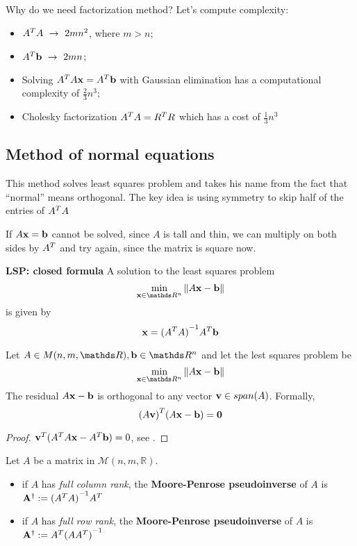 \documentclass[computationalMathematics.tex]{subfiles}
\begin{document}
\noindent Why do we need factorization method?
Let's compute complexity:
\begin{itemize}
  \item ${A}^{T} A ~ \rightarrow ~ 2m{n}^{2}$, where $m>n$;
  \item ${A}^{T} {\bf b } ~ \rightarrow ~ 2mn$;
  \item Solving ${A}^{T} A {\bf x } = {A}^{T} {\bf b }$ with Gaussian elimination has a computational complexity of $\frac{2}{3}{n}^{3}$;
  \item Cholesky factorization ${A}^{T} A = {R}^{T} R$ which has a cost of $\frac{1}{3}{n}^{3}$
\end{itemize}

\subsection{Method of normal equations}
This method solves least squares problem and takes his name from the fact that ``normal'' means orthogonal.
The key idea is using symmetry to skip half of the entries of ${A}^{T}A$

If $A{\bf x }={\bf b }$ cannot be solved, since $A$ is tall and thin, we can multiply on both sides by ${A}^{T}$ and try again, since the matrix is square now.

\begin{myframe}{\bf LSP: closed formula}
	A solution to the least squares problem
	\[
		\min\limits_{\vect{x} \in \R^n} \norm{A \vect{x} - \vect{b}}
	\]
	is given by 
	\[
		{\bf x } = {({A}^{T}A)}^{-1} {A}^{T} {\bf b }
	\]
\end{myframe}

\begin{proposition}
	Let $A \in M(n,m, \R), \vect{b} \in \R^n$ and let the lest squares problem be
	\[
	\min\limits_{\vect{x} \in \R^n} \norm{A \vect{x} - \vect{b}}
	\]
	The residual $A{\bf x } - {\bf b }$ is orthogonal to any vector ${\bf v } \in span(A)$.
	Formally,
	\[
		 {(A{\bf v })}^{T} (A{\bf x } - {\bf b }) = {\bf 0 }
	\]
\end{proposition}

\begin{proof}
	${{\bf v }}^{T} ({A}^{T} A {\bf x } - {A}^{T} {\bf b }) = 0$, see .
\end{proof}

\begin{definition}
  Let $A$ be a matrix in $\mathcal{M}(n, m, \mathds{R})$.
  \begin{itemize}
  	\item if $A$ has \emph{full column rank}, the \textbf{Moore-Penrose pseudoinverse} of $A$ is ${\bf {A}^{\dag}} := {({A}^{T}A)}^{-1} {A}^{T}$
  	\item if $A$ has \emph{full row rank}, the \textbf{Moore-Penrose pseudoinverse} of $A$ is ${\bf {A}^{\dag}} := {A}^{T} {(A{A}^{T})}^{-1}$
  \end{itemize}
\end{definition}
\end{document}
